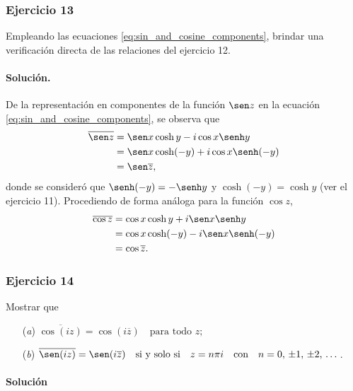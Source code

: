 \documentclass[a4paper]{report}
\begin{document}
\subsubsection{Ejercicio 13}

Empleando las ecuaciones \ref{eq:sin_and_cosine_components}, brindar una verificación directa de las relaciones del ejercicio 12.

\paragraph{Solución.} De la representación en componentes de la función \(\sen z\) en la ecuación \ref{eq:sin_and_cosine_components}, se observa que 
\begin{align*}
 \overline{\sen z}&=\sen x\cosh y-i\cos x\senh y\\
   &=\sen x\cosh(-y)+i\cos x\senh(-y)\\
   &=\sen\overline{z},
\end{align*}
donde se consideró que \(\senh(-y)=-\senh y\) y \(\cosh(-y)=\cosh y\) (ver el ejercicio 11). Procediendo de forma análoga para la función \(\cos z\),
\begin{align*}
 \overline{\cos z}&=\cos x\cosh y+i\sen x\senh y\\
   &=\cos x\cosh(-y)-i\sen x\senh(-y)\\
   &=\cos\overline{z}.
\end{align*}

\subsubsection{Ejercicio 14}

Mostrar que 
\begin{enumerate}
 \item[(\textit{a})] \(\displaystyle\overline{\cos(iz)}=\cos(i\overline{z})\quad\textrm{para todo }z;\)
 \item[(\textit{b})] \(\displaystyle\overline{\sen(iz)}=\sen(i\overline{z})\quad\textrm{si y solo si}\quad z=n\pi i\quad\textrm{con}\quad n=0,\,\pm1,\,\pm2,\,\dots\).
\end{enumerate} 

\paragraph{Solución}
\end{document}
